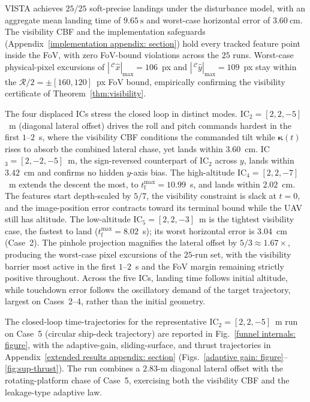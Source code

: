 \documentclass{IEEEtaes}
\theoremstyle{definition}
\theoremstyle{remark}
\begin{document}
VISTA achieves $25/25$ soft-precise landings under the disturbance model, with an aggregate mean landing time of $9.65~\text{s}$ and worst-case horizontal error of $3.60~\text{cm}$. The visibility CBF and the implementation safeguards (Appendix~\ref{implementation appendix: section}) hold every tracked feature point inside the FoV, with zero FoV-bound violations across the $25$ runs. Worst-case physical-pixel excursions of $|\,^\mathcal{C}\hat{x}|_{\max}=106$~px and $|\,^\mathcal{C}\hat{y}|_{\max}=109$~px stay within the $\mathcal{R}/2=\pm[160,120]$~px FoV bound, empirically confirming the visibility certificate of Theorem~\ref{thm:visibility}.

The four displaced ICs stress the closed loop in distinct modes. IC$_2=[2,2,-5]$~m (diagonal lateral offset) drives the roll and pitch commands hardest in the first $1$--$2$~s, where the visibility CBF conditions the commanded tilt while $\boldsymbol{\kappa}(t)$ rises to absorb the combined lateral chase, yet lands within $3.60$~cm. IC$_3=[2,-2,-5]$~m, the sign-reversed counterpart of IC$_2$ across $y$, lands within $3.42$~cm and confirms no hidden $y$-axis bias. The high-altitude IC$_4=[2,2,-7]$~m extends the descent the most, to $t_\text{f}^{\max}=10.99$~s, and lands within $2.02$~cm. The features start depth-scaled by $5/7$, the visibility constraint is slack at $t=0$, and the image-position error contracts toward its terminal bound while the UAV still has altitude. The low-altitude IC$_5=[2,2,-3]$~m is the tightest visibility case, the fastest to land ($t_\text{f}^{\max}=8.02$~s); its worst horizontal error is $3.04$~cm (Case~2). The pinhole projection magnifies the lateral offset by $5/3\approx 1.67\times$, producing the worst-case pixel excursions of the $25$-run set, with the visibility barrier most active in the first $1$--$2$~s and the FoV margin remaining strictly positive throughout. Across the five ICs, landing time follows initial altitude, while touchdown error follows the oscillatory demand of the target trajectory, largest on Cases~2--4, rather than the initial geometry.

The closed-loop time-trajectories for the representative IC$_2=[2,2,-5]$~m run on Case~5 (circular ship-deck trajectory) are reported in Fig.~\ref{funnel internals: figure}, with the adaptive-gain, sliding-surface, and thrust trajectories in Appendix~\ref{extended results appendix: section} (Figs.~\ref{adaptive gain: figure}--\ref{fig:sup-thrust}). The run combines a $2.83$-m diagonal lateral offset with the rotating-platform chase of Case~5, exercising both the visibility CBF and the leakage-type adaptive law.
\end{document}

